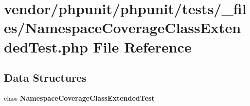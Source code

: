 \section{vendor/phpunit/phpunit/tests/\+\_\+files/\+Namespace\+Coverage\+Class\+Extended\+Test.php File Reference}
\label{phpunit_2tests_2__files_2_namespace_coverage_class_extended_test_8php}
\subsection*{Data Structures}
\begin{DoxyCompactItemize}
\item 
class {\bf Namespace\+Coverage\+Class\+Extended\+Test}
\end{DoxyCompactItemize}
